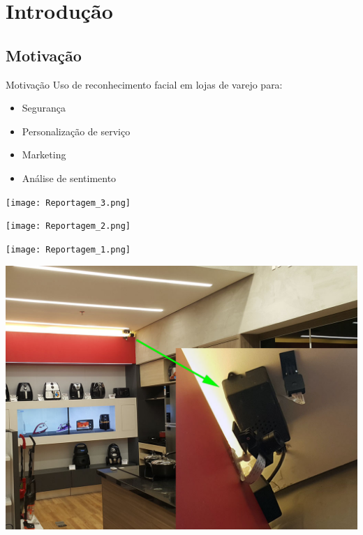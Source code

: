 \section{Introdução}

\subsection{Motivação}

\begin{frame}{Motivação}
Uso de reconhecimento facial em lojas de varejo \pause para:
\medskip
\begin{itemize}
    \item Segurança
    \pause
    \item Personalização de serviço
    \pause
    \item Marketing
    \pause
    \item Análise de sentimento
\end{itemize}
\end{frame}


\begin{frame}
    \centerline{\noindent\texttt{[image: Reportagem\_3.png]}}
\end{frame}


\begin{frame}
    \centerline{\noindent\texttt{[image: Reportagem\_2.png]}}
\end{frame}


\begin{frame}
    \centerline{\noindent\texttt{[image: Reportagem\_1.png]}}
\end{frame}

\begin{frame}
    \centerline{\noindent\includegraphics[width=0.8\linewidth]{imagens/ponto_frio_camera.jpg}}
\end{frame}

